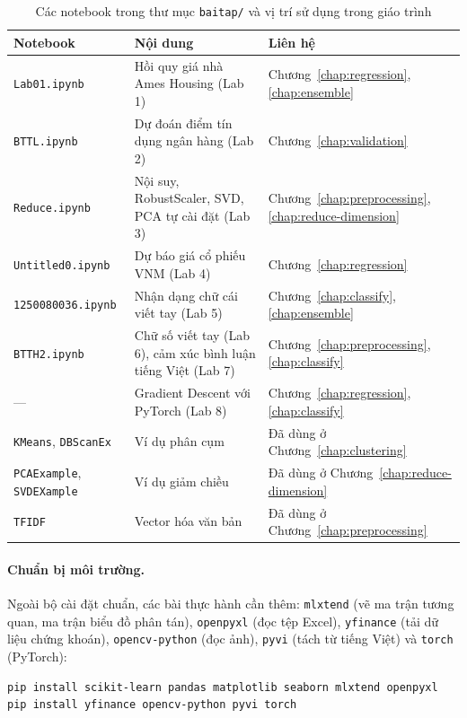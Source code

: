 \begin{table}[H]
\centering
\begin{tabular}{|l|p{5.6cm}|p{4.2cm}|}
\hline
\textbf{Notebook} & \textbf{Nội dung} & \textbf{Liên hệ} \\
\hline
\texttt{Lab01.ipynb} & Hồi quy giá nhà Ames Housing (Lab 1) & Chương~\ref{chap:regression}, \ref{chap:ensemble} \\ \hline
\texttt{BTTL.ipynb} & Dự đoán điểm tín dụng ngân hàng (Lab 2) & Chương~\ref{chap:validation} \\ \hline
\texttt{Reduce.ipynb} & Nội suy, RobustScaler, SVD, PCA tự cài đặt (Lab 3) & Chương~\ref{chap:preprocessing}, \ref{chap:reduce-dimension} \\ \hline
\texttt{Untitled0.ipynb} & Dự báo giá cổ phiếu VNM (Lab 4) & Chương~\ref{chap:regression} \\ \hline
\texttt{1250080036.ipynb} & Nhận dạng chữ cái viết tay (Lab 5) & Chương~\ref{chap:classify}, \ref{chap:ensemble} \\ \hline
\texttt{BTTH2.ipynb} & Chữ số viết tay (Lab 6), cảm xúc bình luận tiếng Việt (Lab 7) & Chương~\ref{chap:preprocessing}, \ref{chap:classify} \\ \hline
--- & Gradient Descent với PyTorch (Lab 8) & Chương~\ref{chap:regression}, \ref{chap:classify} \\ \hline
\texttt{KMeans}, \texttt{DBScanEx} & Ví dụ phân cụm & Đã dùng ở Chương~\ref{chap:clustering} \\ \hline
\texttt{PCAExample}, \texttt{SVDEXample} & Ví dụ giảm chiều & Đã dùng ở Chương~\ref{chap:reduce-dimension} \\ \hline
\texttt{TFIDF} & Vector hóa văn bản & Đã dùng ở Chương~\ref{chap:preprocessing} \\ \hline
\end{tabular}
\caption{Các notebook trong thư mục \texttt{baitap/} và vị trí sử dụng trong giáo trình}
\end{table}

\paragraph{Chuẩn bị môi trường.} Ngoài bộ cài đặt chuẩn, các bài thực hành cần thêm: \texttt{mlxtend} (vẽ ma trận tương quan, ma trận biểu đồ phân tán), \texttt{openpyxl} (đọc tệp Excel), \texttt{yfinance} (tải dữ liệu chứng khoán), \texttt{opencv-python} (đọc ảnh), \texttt{pyvi} (tách từ tiếng Việt) và \texttt{torch} (PyTorch):
\begin{lstlisting}[language=bash, caption={Cài đặt thư viện cho các bài thực hành}]
pip install scikit-learn pandas matplotlib seaborn mlxtend openpyxl
pip install yfinance opencv-python pyvi torch
\end{lstlisting}

